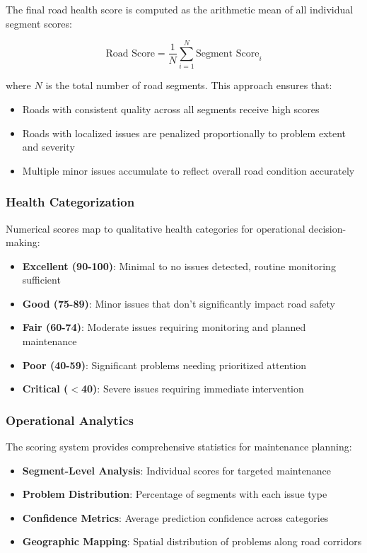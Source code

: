 \documentclass[12pt]{article}
\begin{document}
The final road health score is computed as the arithmetic mean of all individual segment scores:

\begin{equation}
\text{Road Score} = \frac{1}{N} \sum_{i=1}^{N} \text{Segment Score}_i
\end{equation}

where $N$ is the total number of road segments. This approach ensures that:
\begin{itemize}[itemsep=1pt,parsep=0pt,topsep=2pt]
\item Roads with consistent quality across all segments receive high scores
\item Roads with localized issues are penalized proportionally to problem extent and severity
\item Multiple minor issues accumulate to reflect overall road condition accurately
\end{itemize}

\subsubsection{Health Categorization}

Numerical scores map to qualitative health categories for operational decision-making:

\begin{itemize}[itemsep=1pt,parsep=0pt,topsep=3pt]
\item \textbf{Excellent (90-100)}: Minimal to no issues detected, routine monitoring sufficient
\item \textbf{Good (75-89)}: Minor issues that don't significantly impact road safety
\item \textbf{Fair (60-74)}: Moderate issues requiring monitoring and planned maintenance
\item \textbf{Poor (40-59)}: Significant problems needing prioritized attention
\item \textbf{Critical ($<$40)}: Severe issues requiring immediate intervention
\end{itemize}

\subsubsection{Operational Analytics}

The scoring system provides comprehensive statistics for maintenance planning:

\begin{itemize}[itemsep=1pt,parsep=0pt,topsep=3pt]
\item \textbf{Segment-Level Analysis}: Individual scores for targeted maintenance
\item \textbf{Problem Distribution}: Percentage of segments with each issue type
\item \textbf{Confidence Metrics}: Average prediction confidence across categories
\item \textbf{Geographic Mapping}: Spatial distribution of problems along road corridors
\end{itemize}
\end{document}
